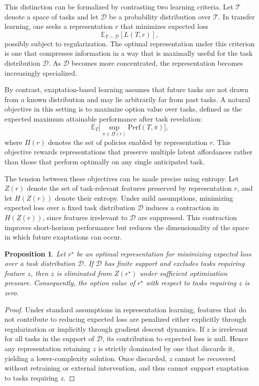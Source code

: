 \documentclass[11pt]{article}
\newtheorem{proposition}{Proposition}
\theoremstyle{definition}
\begin{document}
This distinction can be formalized by contrasting two learning criteria. Let $\mathcal{T}$ denote a space of tasks and let $\mathcal{D}$ be a probability distribution over $\mathcal{T}$. In transfer learning, one seeks a representation $r$ that minimizes expected loss
\[
\mathbb{E}_{T \sim \mathcal{D}}[L(T,r)],
\]
possibly subject to regularization. The optimal representation under this criterion is one that compresses information in a way that is maximally useful for the task distribution $\mathcal{D}$. As $\mathcal{D}$ becomes more concentrated, the representation becomes increasingly specialized.

By contrast, exaptation-based learning assumes that future tasks are not drawn from a known distribution and may lie arbitrarily far from past tasks. A natural objective in this setting is to maximize option value over tasks, defined as the expected maximum attainable performance after task revelation:
\[
\mathbb{E}_{T}\Big[\sup_{\pi \in \Pi(r)} \mathrm{Perf}(T,\pi)\Big],
\]
where $\Pi(r)$ denotes the set of policies enabled by representation $r$. This objective rewards representations that preserve multiple latent affordances rather than those that perform optimally on any single anticipated task.

The tension between these objectives can be made precise using entropy. Let $Z(r)$ denote the set of task-relevant features preserved by representation $r$, and let $H(Z(r))$ denote their entropy. Under mild assumptions, minimizing expected loss over a fixed task distribution $\mathcal{D}$ induces a contraction in $H(Z(r))$, since features irrelevant to $\mathcal{D}$ are suppressed. This contraction improves short-horizon performance but reduces the dimensionality of the space in which future exaptations can occur.

\begin{proposition}
Let $r^\star$ be an optimal representation for minimizing expected loss over a task distribution $\mathcal{D}$. If $\mathcal{D}$ has finite support and excludes tasks requiring feature $z$, then $z$ is eliminated from $Z(r^\star)$ under sufficient optimization pressure. Consequently, the option value of $r^\star$ with respect to tasks requiring $z$ is zero.
\end{proposition}

\begin{proof}
Under standard assumptions in representation learning, features that do not contribute to reducing expected loss are penalized either explicitly through regularization or implicitly through gradient descent dynamics. If $z$ is irrelevant for all tasks in the support of $\mathcal{D}$, its contribution to expected loss is null. Hence any representation retaining $z$ is strictly dominated by one that discards it, yielding a lower-complexity solution. Once discarded, $z$ cannot be recovered without retraining or external intervention, and thus cannot support exaptation to tasks requiring $z$.
\end{proof}
\end{document}
